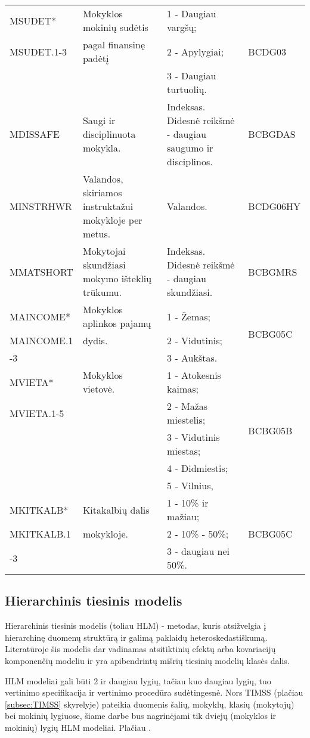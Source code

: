 \documentclass[12pt,a4paper]{article}
\begin{document}
\begin{small}
\begin{longtable}{| p{} | p{5cm} | p{5cm} | p{} |}
MSUDET* & Mokyklos mokinių sudėtis & 1 - Daugiau vargšų; & \multirow{3}{*}{BCDG03}\\
MSUDET.1-3 & pagal finansinę padėtį & 2 - Apylygiai; & \\
& & 3 - Daugiau turtuolių. & \\ \hline
MDISSAFE & Saugi ir disciplinuota mokykla. & Indeksas. Didesnė reikšmė - daugiau saugumo ir disciplinos. &BCBGDAS\\ \hline
MINSTRHWR & Valandos, skiriamos instruktažui mokykloje per metus. & Valandos. &BCDG06HY\\ \hline
MMATSHORT & Mokytojai skundžiasi mokymo išteklių trūkumu. & Indeksas. Didesnė reikšmė - daugiau skundžiasi. &BCBGMRS\\ \hline
MAINCOME* & Mokyklos aplinkos pajamų & 1 - Žemas; & \multirow{3}{*}{BCBG05C}\\
MAINCOME.1& dydis. & 2 - Vidutinis; & \\
-3& & 3 - Aukštas. & \\ \hline
MVIETA* & Mokyklos vietovė. & 1 - Atokesnis kaimas; & \multirow{5}{*}{BCBG05B}\\
MVIETA.1-5& & 2 - Mažas miestelis; & \\
& & 3 - Vidutinis miestas; & \\
& & 4 - Didmiestis; & \\
& & 5 - Vilnius, & \\ \hline
MKITKALB* & Kitakalbių dalis & 1 - 10\% ir mažiau; & \multirow{3}{*}{BCBG05C}\\
MKITKALB.1& mokykloje. & 2 - 10\% - 50\%; & \\
-3& & 3 - daugiau nei 50\%. & \\ \hline
\end{longtable}
\end{small}

\subsection{Hierarchinis tiesinis modelis}
\indent Hierarchinis tiesinis modelis (toliau HLM) - metodas, kuris atsižvelgia į hierarchinę duomenų struktūrą ir galimą paklaidų heteroskedastiškumą. Literatūroje šis modelis dar vadinamas atsitiktinių efektų arba kovariacijų komponenčių modeliu ir yra apibendrintų mišrių tiesinių modelių klasės dalis\cite{hlmmixed}.

\indent HLM modeliai gali būti 2 ir daugiau lygių, tačiau kuo daugiau lygių, tuo vertinimo specifikacija ir vertinimo procedūra sudėtingesnė. Nors TIMSS (plačiau \ref{subsec:TIMSS} skyrelyje) pateikia duomenis šalių, mokyklų, klasių (mokytojų) bei mokinių lygiuose, šiame darbe bus nagrinėjami tik dviejų (mokyklos ir mokinių) lygių HLM modeliai. Plačiau \cite{cek}.
\end{document}
